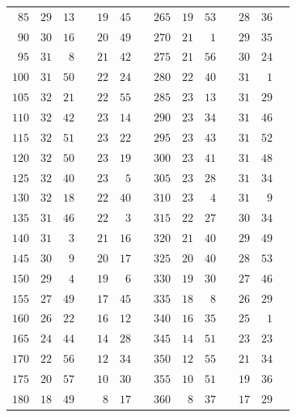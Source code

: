 \begin{center}
\begin{tabular}{r|rrl|rrl||r|rrl|rrl}
$85$&$29$&$13$&&$19$&$45$&&$265$&$19$&$53$&&$28$&$36$&\\
$90$&$30$&$16$&&$20$&$49$&&$270$&$21$&$1$&&$29$&$35$&\\
$95$&$31$&$8$&&$21$&$42$&&$275$&$21$&$56$&&$30$&$24$&\\
$100$&$31$&$50$&&$22$&$24$&&$280$&$22$&$40$&&$31$&$1$&\\
$105$&$32$&$21$&&$22$&$55$&&$285$&$23$&$13$&&$31$&$29$&\\
$110$&$32$&$42$&&$23$&$14$&&$290$&$23$&$34$&&$31$&$46$&\\
$115$&$32$&$51$&&$23$&$22$&&$295$&$23$&$43$&&$31$&$52$&\\
$120$&$32$&$50$&&$23$&$19$&&$300$&$23$&$41$&&$31$&$48$&\\
$125$&$32$&$40$&&$23$&$5$&&$305$&$23$&$28$&&$31$&$34$&\\
$130$&$32$&$18$&&$22$&$40$&&$310$&$23$&$4$&&$31$&$9$&\\
$135$&$31$&$46$&&$22$&$3$&&$315$&$22$&$27$&&$30$&$34$&\\
$140$&$31$&$3$&&$21$&$16$&&$320$&$21$&$40$&&$29$&$49$&\\
$145$&$30$&$9$&&$20$&$17$&&$325$&$20$&$40$&&$28$&$53$&\\
$150$&$29$&$4$&&$19$&$6$&&$330$&$19$&$30$&&$27$&$46$&\\
$155$&$27$&$49$&&$17$&$45$&&$335$&$18$&$8$&&$26$&$29$&\\
$160$&$26$&$22$&&$16$&$12$&&$340$&$16$&$35$&&$25$&$1$&\\
$165$&$24$&$44$&&$14$&$28$&&$345$&$14$&$51$&&$23$&$23$&\\
$170$&$22$&$56$&&$12$&$34$&&$350$&$12$&$55$&&$21$&$34$&\\
$175$&$20$&$57$&&$10$&$30$&&$355$&$10$&$51$&&$19$&$36$&\\
$180$&$18$&$49$&&$8$&$17$&&$360$&$8$&$37$&&$17$&$29$&\\
\end{tabular}
\endgroup
\end{center}
